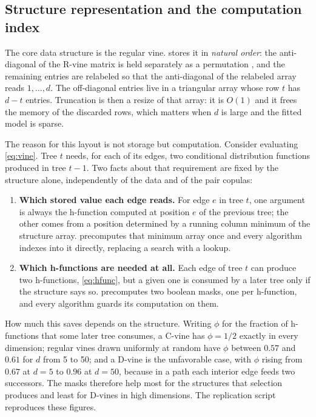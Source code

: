 \documentclass[article]{jss}
\begin{document}
\subsection{Structure representation and the computation index}\label{sec:decomposition}

The core data structure is the regular vine.   stores it in
\emph{natural order}: the anti-diagonal of the R-vine matrix is held separately
as a permutation , and the remaining entries are relabeled so that
the anti-diagonal of the relabeled array reads $1, \dots, d$.  The off-diagonal entries live in a
triangular array whose row $t$ has $d-t$ entries.  Truncation is then a
resize of that array: it is $O(1)$ and it frees the memory of the discarded
rows, which matters when $d$ is large and the fitted model is sparse.

The reason for this layout is not storage but computation.  Consider evaluating
\eqref{eq:vine}.  Tree $t$ needs, for each of its edges, two conditional
distribution functions produced in tree $t-1$.  Two facts about that
requirement are fixed by the structure alone, independently of the data and of
the pair copulas:

\begin{enumerate}
  \item \textbf{Which stored value each edge reads.}  For edge $e$ in tree $t$,
        one argument is always the h-function computed at position $e$ of the
        previous tree; the other comes from a position determined by a running
        column minimum of the structure array.   precomputes
        that minimum array once and every algorithm indexes into it directly,
        replacing a search with a lookup.
  \item \textbf{Which h-functions are needed at all.}  Each edge of tree $t$
        can produce two h-functions, \eqref{eq:hfunc}, but a given one is
        consumed by a later tree only if the structure says so.
         precomputes two boolean masks, one per h-function,
        and every algorithm guards its computation on them.
\end{enumerate}

How much this saves depends on the structure.  Writing $\phi$ for the
fraction of h-functions that some later tree consumes, a C-vine has
$\phi = 1/2$ exactly in every dimension; regular vines drawn uniformly at
random have $\phi$ between $0.57$ and $0.61$ for $d$ from 5 to 50; and a
D-vine is the unfavorable case, with $\phi$ rising from $0.67$ at $d = 5$ to
$0.96$ at $d = 50$, because in a path each interior edge feeds two successors.
The masks therefore help most for the structures that selection produces and
least for D-vines in high dimensions.  The replication script reproduces these
figures.
\end{document}
